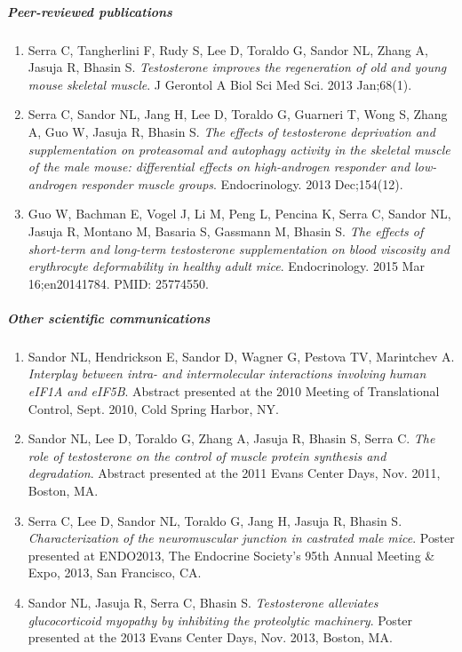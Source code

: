 \documentclass[12pt,english]{report}\usepackage[]{graphicx}\usepackage[]{color}
\begin{document}
\subparagraph*{Peer-reviewed publications}
\begin{enumerate}
\item Serra C, Tangherlini F, Rudy S, Lee D, Toraldo G, Sandor NL, Zhang
A, Jasuja R, Bhasin S. \emph{Testosterone improves the regeneration
of old and young mouse skeletal muscle}. J Gerontol A Biol Sci Med
Sci. 2013 Jan;68(1).
\item Serra C, Sandor NL, Jang H, Lee D, Toraldo G, Guarneri T, Wong S,
Zhang A, Guo W, Jasuja R, Bhasin S. \emph{The effects of testosterone
deprivation and supplementation on proteasomal and autophagy activity
in the skeletal muscle of the male mouse: differential effects on
high-androgen responder and low-androgen responder muscle groups}.
Endocrinology. 2013 Dec;154(12).
\item Guo W, Bachman E, Vogel J, Li M, Peng L, Pencina K, Serra C, Sandor
NL, Jasuja R, Montano M, Basaria S, Gassmann M, Bhasin S. \emph{The
effects of short-term and long-term testosterone supplementation on
blood viscosity and erythrocyte deformability in healthy adult mice}.
Endocrinology. 2015 Mar 16;en20141784. PMID: 25774550.
\end{enumerate}

\subparagraph*{Other scientific communications}
\begin{enumerate}
\item Sandor NL, Hendrickson E, Sandor D, Wagner G, Pestova TV, Marintchev
A. \emph{Interplay between intra- and intermolecular interactions
involving human eIF1A and eIF5B}. Abstract presented at the 2010 Meeting
of Translational Control, Sept. 2010, Cold Spring Harbor, NY.
\item Sandor NL, Lee D, Toraldo G, Zhang A, Jasuja R, Bhasin S, Serra C.
\emph{The role of testosterone on the control of muscle protein synthesis
and degradation}. Abstract presented at the 2011 Evans Center Days,
Nov. 2011, Boston, MA.
\item Serra C, Lee D, Sandor NL, Toraldo G, Jang H, Jasuja R, Bhasin S.
\emph{Characterization of the neuromuscular junction in castrated
male mice}. Poster presented at ENDO2013, The Endocrine Society's
95th Annual Meeting \& Expo, 2013, San Francisco, CA.
\item Sandor NL, Jasuja R, Serra C, Bhasin S. \emph{Testosterone alleviates
glucocorticoid myopathy by inhibiting the proteolytic machinery}.
Poster presented at the 2013 Evans Center Days, Nov. 2013, Boston,
MA.\end{enumerate}
\end{document}
